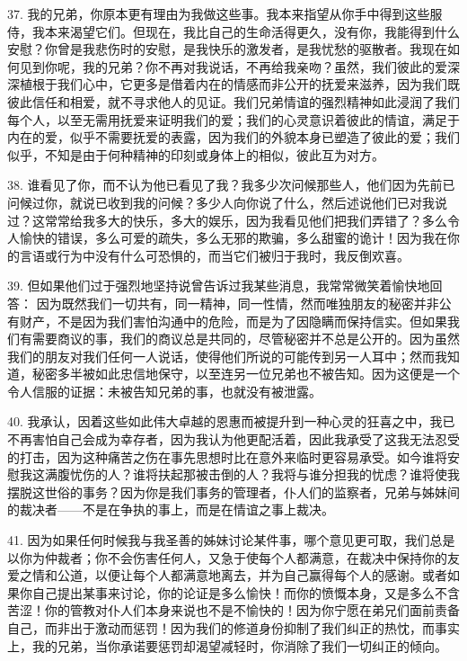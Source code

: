 37. 我的兄弟，你原本更有理由为我做这些事。我本来指望从你手中得到这些服侍，我本来渴望它们。但现在，我比自己的生命活得更久，没有你，我能得到什么安慰？你曾是我悲伤时的安慰，是我快乐的激发者，是我忧愁的驱散者。我现在如何见到你呢，我的兄弟？你不再对我说话，不再给我亲吻？虽然，我们彼此的爱深深植根于我们心中，它更多是借着内在的情感而非公开的抚爱来滋养，因为我们既彼此信任和相爱，就不寻求他人的见证。我们兄弟情谊的强烈精神如此浸润了我们每个人，以至无需用抚爱来证明我们的爱；我们的心灵意识着彼此的情谊，满足于内在的爱，似乎不需要抚爱的表露，因为我们的外貌本身已塑造了彼此的爱；我们似乎，不知是由于何种精神的印刻或身体上的相似，彼此互为对方。\par

38. 谁看见了你，而不认为他已看见了我？我多少次问候那些人，他们因为先前已问候过你，就说已收到我的问候？多少人向你说了什么，然后述说他们已对我说过？这常常给我多大的快乐，多大的娱乐，因为我看见他们把我们弄错了？多么令人愉快的错误，多么可爱的疏失，多么无邪的欺骗，多么甜蜜的诡计！因为我在你的言语或行为中没有什么可恐惧的，而当它们被归于我时，我反倒欢喜。\par

39. 但如果他们过于强烈地坚持说曾告诉过我某些消息，我常常微笑着愉快地回答： 因为既然我们一切共有，同一精神，同一性情，然而唯独朋友的秘密并非公有财产，不是因为我们害怕沟通中的危险，而是为了因隐瞒而保持信实。但如果我们有需要商议的事，我们的商议总是共同的，尽管秘密并不总是公开的。因为虽然我们的朋友对我们任何一人说话，使得他们所说的可能传到另一人耳中；然而我知道，秘密多半被如此忠信地保守，以至连另一位兄弟也不被告知。因为这便是一个令人信服的证据：未被告知兄弟的事，也就没有被泄露。\par

40. 我承认，因着这些如此伟大卓越的恩惠而被提升到一种心灵的狂喜之中，我已不再害怕自己会成为幸存者，因为我认为他更配活着，因此我承受了这我无法忍受的打击，因为这种痛苦之伤在事先思想时比在意外来临时更容易承受。如今谁将安慰我这满腹忧伤的人？谁将扶起那被击倒的人？我将与谁分担我的忧虑？谁将使我摆脱这世俗的事务？因为你是我们事务的管理者，仆人们的监察者，兄弟与姊妹间的裁决者——不是在争执的事上，而是在情谊之事上裁决。\par

41. 因为如果任何时候我与我圣善的姊妹讨论某件事，哪个意见更可取，我们总是以你为仲裁者；你不会伤害任何人，又急于使每个人都满意，在裁决中保持你的友爱之情和公道，以便让每个人都满意地离去，并为自己赢得每个人的感谢。或者如果你自己提出某事来讨论，你的论证是多么愉快！而你的愤慨本身，又是多么不含苦涩！你的管教对仆人们本身来说也不是不愉快的！因为你宁愿在弟兄们面前责备自己，而非出于激动而惩罚！因为我们的修道身份抑制了我们纠正的热忱，而事实上，我的兄弟，当你承诺要惩罚却渴望减轻时，你消除了我们一切纠正的倾向。\par

